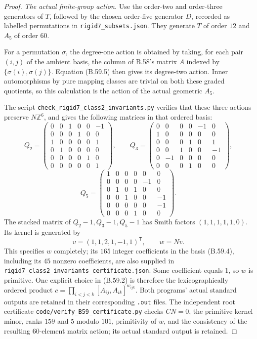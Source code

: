 \begin{proof}
\emph{The actual finite-group action.}
Use the order-two and order-three generators of $T$, followed
by the chosen order-five generator $D$, recorded as labelled
permutations in \nolinkurl{rigid7_subsets.json}.
They generate $T$ of order $12$ and $A_5$ of order $60$.

For a permutation $\sigma$, the degree-one
action is obtained by taking, for each pair $(i,j)$ of the
ambient basis, the column of B.58's matrix $A$ indexed by
$\{\sigma(i),\sigma(j)\}$.
Equation (B.59.5) then gives its degree-two action.
Inner automorphisms by pure mapping classes are trivial
on both these graded quotients, so this calculation is the
action of the actual geometric $A_5$.

The script \nolinkurl{check_rigid7_class2_invariants.py}
verifies that these three actions preserve $N\mathbb Z^6$,
and gives the following matrices in that ordered basis:
\[
 Q_2=\begin{pmatrix}
 0&0&1&0&0&-1\\0&0&0&1&0&0\\1&0&0&0&0&1\\
 0&1&0&0&0&0\\0&0&0&0&1&0\\0&0&0&0&0&1
 \end{pmatrix},\qquad
 Q_3=\begin{pmatrix}
 0&0&0&0&-1&0\\1&0&0&0&0&0\\0&0&0&1&0&1\\
 0&0&1&0&0&-1\\0&-1&0&0&0&0\\0&0&0&1&0&0
 \end{pmatrix},
\]
\[
 Q_5=\begin{pmatrix}
 1&0&0&0&0&0\\0&0&0&0&-1&0\\0&1&0&1&0&0\\
 0&0&1&0&0&-1\\0&0&0&0&0&-1\\0&0&0&1&0&0
 \end{pmatrix}.
                                                               \tag{B.59.7}
\]
The stacked matrix of $Q_2-1,Q_3-1,Q_5-1$ has Smith
factors $(1,1,1,1,1,0)$.  Its kernel is generated by
\[
          v=(1,1,2,1,-1,1)^{\mathsf T},\qquad w=Nv.
                                                               \tag{B.59.8}
\]
This specifies $w$ completely; its $165$ integer coefficients
in the basis (B.59.4), including its $45$ nonzero coefficients,
are also supplied in
\nolinkurl{rigid7_class2_invariants_certificate.json}.
Some coefficient equals $1$, so $w$ is primitive.
One explicit choice in (B.59.2) is therefore the lexicographically
ordered product $c=\prod_{i<j<k}[A_{ij},A_{ik}]^{w_{ijk}}$.
Both programs' actual standard outputs are retained in their
corresponding \nolinkurl{.out} files.
The independent root certificate
\nolinkurl{code/verify_B59_certificate.py}
checks $CN=0$, the primitive kernel minor, ranks $159$ and
$5$ modulo $101$, primitivity of $w$, and the consistency
of the resulting $60$-element matrix action; its actual
standard output is retained.


\end{proof}
